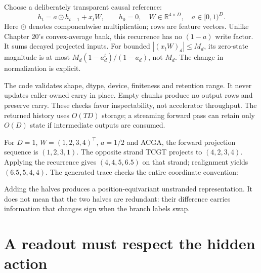Choose a deliberately transparent causal reference:
\begin{equation}
 h_t=a\odot h_{t-1}+x_tW,\qquad h_0=0,
 \quad W\in\mathbb R^{4\times D},\quad a\in[0,1)^D.
 \label{eq:recurrence}
\end{equation}
Here $\odot$ denotes componentwise multiplication; rows are feature vectors.
Unlike Chapter 20's convex-average bank, this recurrence has no $(1-a)$
write factor. It sums decayed projected inputs. For bounded
$|(x_tW)_d|\leq M_d$, its zero-state magnitude is at most
$M_d(1-a_d^t)/(1-a_d)$, not $M_d$. The change in normalization is explicit.


The code validates shape, dtype, device, finiteness and retention range.
It never updates caller-owned carry in place. Empty chunks produce no output
rows and preserve carry. These checks favor inspectability, not accelerator
throughput. The returned history uses $O(TD)$ storage; a streaming forward
pass can retain only $O(D)$ state if intermediate outputs are consumed.


For $D=1$, $W=(1,2,3,4)^\top$, $a=1/2$ and ACGA, the forward projection
sequence is $(1,2,3,1)$. The opposite strand TCGT projects to $(4,2,3,4)$.
Applying the recurrence gives $(4,4,5,6.5)$ on that strand; realignment yields
$(6.5,5,4,4)$. The generated trace checks the entire coordinate convention:
\begin{center}\end{center}
Adding the halves produces a position-equivariant unstranded representation.
It does not mean that the two halves are redundant: their difference carries
information that changes sign when the branch labels swap.

\section{A readout must respect the hidden action}

